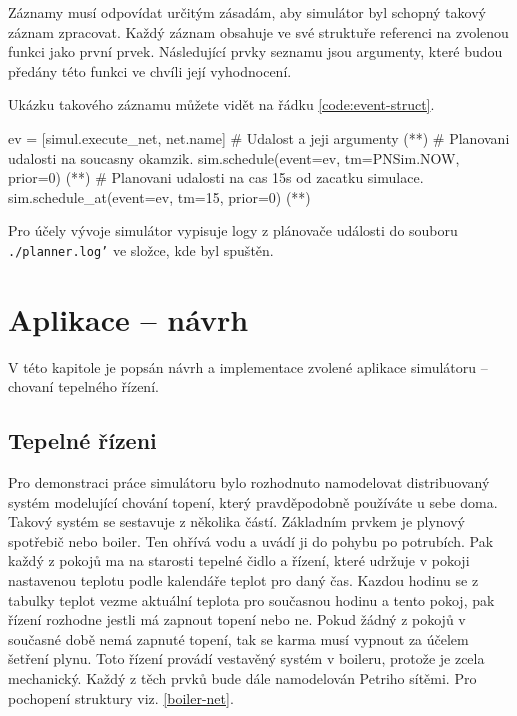 Záznamy musí odpovídat určitým zásadám, aby simulátor byl schopný takový záznam zpracovat. Každý záznam obsahuje ve své struktuře referenci na zvolenou funkci jako první prvek. Následující prvky seznamu jsou argumenty, které budou předány této funkci ve chvíli její vyhodnocení.

Ukázku takového záznamu můžete vidět na řádku \ref{code:event-struct}.

\begin{python}
 ev = [simul.execute_net, net.name] # Udalost a jeji argumenty (*\label{code:event-struct}*)
 # Planovani udalosti na soucasny okamzik.
 sim.schedule(event=ev, tm=PNSim.NOW, prior=0) (*\label{code:schedule}*)
 # Planovani udalosti na cas 15s od zacatku simulace.
 sim.schedule_at(event=ev, tm=15, prior=0) (*\label{code:schedule-at}*)
\end{python}

Pro účely vývoje simulátor vypisuje logy z plánovače události do souboru \texttt{./planner.log'} ve složce, kde byl spuštěn.

\chapter{Aplikace -- návrh}
\label{chap:app-arch}

V této kapitole je popsán návrh a implementace zvolené aplikace simulátoru -- chovaní tepelného řízení.

\section{Tepelné řízeni}
\label{sec:tepelne-rizeni}

Pro demonstraci práce simulátoru bylo rozhodnuto namodelovat distribuovaný systém modelující chování topení, který pravděpodobně používáte u sebe doma. Takový systém se sestavuje z několika částí. Základním prvkem je plynový spotřebič nebo boiler. Ten ohřívá vodu a uvádí ji do pohybu po potrubích. Pak každý z pokojů ma na starosti tepelné čidlo a řízení, které udržuje v pokoji nastavenou teplotu podle kalendáře teplot pro daný čas. Kazdou hodinu se z tabulky teplot vezme aktuální teplota pro současnou hodinu a tento pokoj, pak řízení rozhodne jestli má zapnout topení nebo ne. Pokud žádný z pokojů v současné době nemá zapnuté topení, tak se karma musí vypnout za účelem šetření plynu. Toto řízení provádí vestavěný systém v boileru, protože je zcela mechanický. Každý z těch prvků bude dále namodelován Petriho sítěmi. Pro pochopení struktury viz. \ref{boiler-net}.

